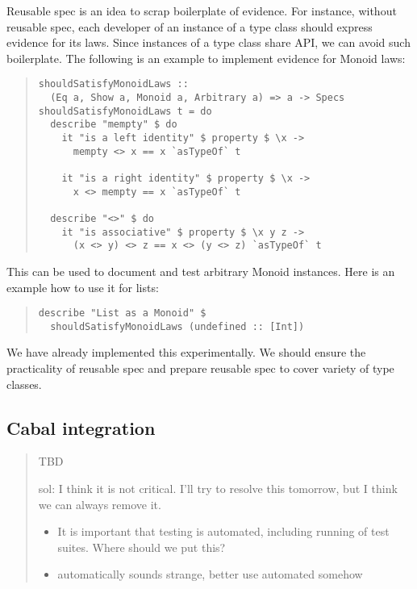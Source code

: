 \documentclass[preprint]{sigplanconf}
\begin{document}
Reusable spec is an idea to scrap boilerplate of evidence.
For instance, without reusable spec,
each developer of an instance of a type class should
express evidence for its laws.
Since instances of a type class share API,
we can avoid such boilerplate.
The following is an example to implement
evidence for Monoid laws:

\begin{quote}
\small
\begin{verbatim}
shouldSatisfyMonoidLaws ::
  (Eq a, Show a, Monoid a, Arbitrary a) => a -> Specs
shouldSatisfyMonoidLaws t = do
  describe "mempty" $ do
    it "is a left identity" $ property $ \x ->
      mempty <> x == x `asTypeOf` t

    it "is a right identity" $ property $ \x ->
      x <> mempty == x `asTypeOf` t

  describe "<>" $ do
    it "is associative" $ property $ \x y z ->
      (x <> y) <> z == x <> (y <> z) `asTypeOf` t
\end{verbatim}
\end{quote}

\noindent This can be used to document and test arbitrary Monoid
instances.
Here is an example how to use it for lists:

\begin{quote}
\small
\begin{verbatim}
describe "List as a Monoid" $
  shouldSatisfyMonoidLaws (undefined :: [Int])
\end{verbatim}
\end{quote}

\noindent We have already implemented this experimentally.
We should ensure the practicality of reusable spec and
prepare reusable spec to cover variety of type classes.

\subsection{Cabal integration}

\begin{quote}
    TBD

    sol: I think it is not critical.  I'll try to resolve this
    tomorrow, but I think we can always remove it.

\begin{itemize}

\item It is important that testing is automated, including running of test
    suites.  Where should we put this?

\item automatically sounds strange, better use automated somehow
\end{itemize}
\end{quote}
\end{document}
